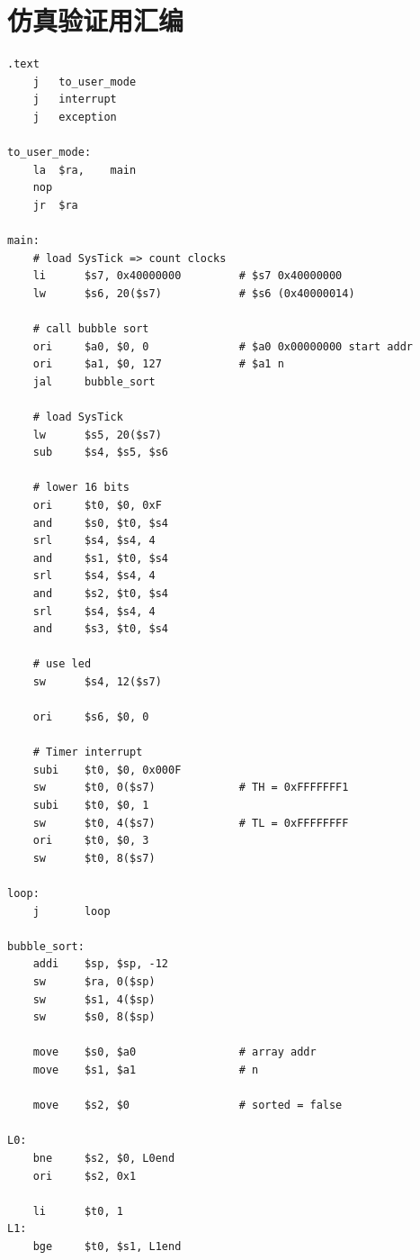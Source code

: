 \documentclass[a4paper]{article}
\begin{document}
\nocite{syn}
\nocite{dmg}
\nocite{计算机组成与设计}

\small{
    
    
}

\newpage

\appendix

\section{仿真验证用汇编\label{adx:asm}}

\begin{verbatim}
.text
    j   to_user_mode
    j   interrupt
    j   exception

to_user_mode:
    la  $ra,    main
    nop
    jr  $ra

main:
    # load SysTick => count clocks
    li      $s7, 0x40000000         # $s7 0x40000000
    lw      $s6, 20($s7)            # $s6 (0x40000014)

    # call bubble sort
    ori     $a0, $0, 0              # $a0 0x00000000 start addr
    ori     $a1, $0, 127            # $a1 n
    jal     bubble_sort

    # load SysTick
    lw      $s5, 20($s7)
    sub     $s4, $s5, $s6

    # lower 16 bits
    ori     $t0, $0, 0xF
    and     $s0, $t0, $s4
    srl     $s4, $s4, 4
    and     $s1, $t0, $s4
    srl     $s4, $s4, 4
    and     $s2, $t0, $s4
    srl     $s4, $s4, 4
    and     $s3, $t0, $s4

    # use led
    sw      $s4, 12($s7)

    ori     $s6, $0, 0

    # Timer interrupt
    subi    $t0, $0, 0x000F
    sw      $t0, 0($s7)             # TH = 0xFFFFFFF1
    subi    $t0, $0, 1
    sw      $t0, 4($s7)             # TL = 0xFFFFFFFF
    ori     $t0, $0, 3
    sw      $t0, 8($s7)

loop:
    j       loop

bubble_sort:
    addi    $sp, $sp, -12
    sw      $ra, 0($sp)
    sw      $s1, 4($sp)
    sw      $s0, 8($sp)

    move    $s0, $a0                # array addr
    move    $s1, $a1                # n

    move    $s2, $0                 # sorted = false

L0:
    bne     $s2, $0, L0end
    ori     $s2, 0x1

    li      $t0, 1
L1:
    bge     $t0, $s1, L1end


\end{verbatim}
\end{document}
